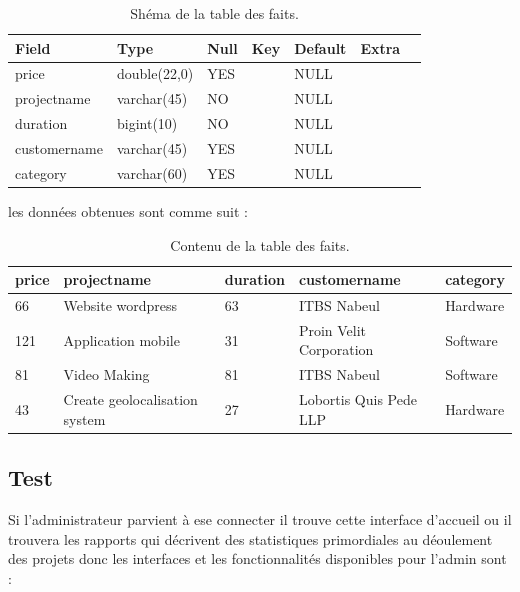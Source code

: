\begin{table}

\begin{tabular}{|l|l|l|l|l|l|l|}
\hline
 \textbf{Field}        & \textbf{Type}         & \textbf{Null} & \textbf{Key}  & \textbf{Default} & \textbf{Extra}   \\
\hline
price        & double(22,0) & YES  &     & NULL    &         \\
\hline
projectname  & varchar(45)  & NO   &     & NULL    &         \\
\hline
duration     & bigint(10)   & NO   &     & NULL    &         \\
\hline
customername & varchar(45)  & YES  &     & NULL    &         \\
\hline
category     & varchar(60)  & YES  &     & NULL    &         \\
\hline
\end{tabular}
\centering
\caption{Sh\'{e}ma de la table des faits.}
\end{table}



les donn\'{e}es obtenues sont comme suit :

\begin{table}

\begin{tabular}{|l|l|l|l|l|}
\hline
price & projectname                   & duration & customername            & category  \\
\hline
66    & Website wordpress             & 63       & ITBS Nabeul             & Hardware  \\
\hline
121   & Application mobile            & 31       & Proin Velit Corporation & Software  \\
\hline
81    & Video Making                  & 81       & ITBS Nabeul             & Software  \\
\hline
43    & Create geolocalisation system & 27       & Lobortis Quis Pede LLP  & Hardware  \\
\hline
\end{tabular}
\centering
\caption{Contenu de la table des faits.}
\end{table}




\subsection{Test}


Si l'administrateur parvient \`{a} ese connecter il trouve cette interface d'accueil
ou il trouvera les rapports qui d\'{e}crivent des statistiques primordiales au
d\'{e}oulement des projets donc les interfaces et les fonctionnalit\'{e}s disponibles
pour l'admin sont :

